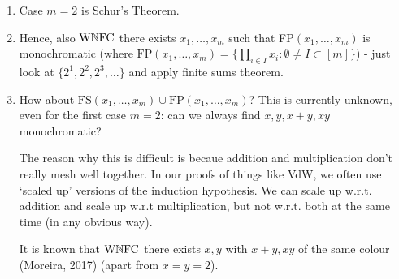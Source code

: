 \documentclass[10pt]{article}
\newcommand{\wnfc}{\textrm{W}\N\textrm{FC}}
\newcommand{\fs}{\textrm{FS}}
\newcommand{\fp}{\textrm{FP}}
\begin{document}
\begin{remark*}[Remarks]
    \begin{enumerate}
        \item Case $m = 2$ is Schur's Theorem.
        \item Hence, also $\wnfc$ there exists $x_1,\dots,x_m$ such that FP$(x_1,\dots,x_m)$ is monochromatic (where $\fp(x_1,\dots,x_m) = \{\prod_{i\in I}x_i : \emptyset \ne I\subset [m]\}$) - just look at $\{2^1,2^2,2^3,\dots\}$ and apply finite sums theorem.
        \item How about $\fs(x_1,\dots,x_m)\cup\fp(x_1,\dots,x_m)$? This is currently unknown, even for the first case $m = 2$: can we always find $x,y,x+y,xy$ monochromatic?
        
        The reason why this is difficult is becaue addition and multiplication don't really mesh well together. In our proofs of things like VdW, we often use `scaled up' versions of the induction hypothesis. We can scale up w.r.t. addition and scale up w.r.t multiplication, but not w.r.t. both at the same time (in any obvious way).

        It is known that $\wnfc$ there exists $x,y$ with $x+y,xy$ of the same colour (Moreira, 2017) (apart from $x = y = 2$).
    \end{enumerate}
\end{remark*}
\end{document}
